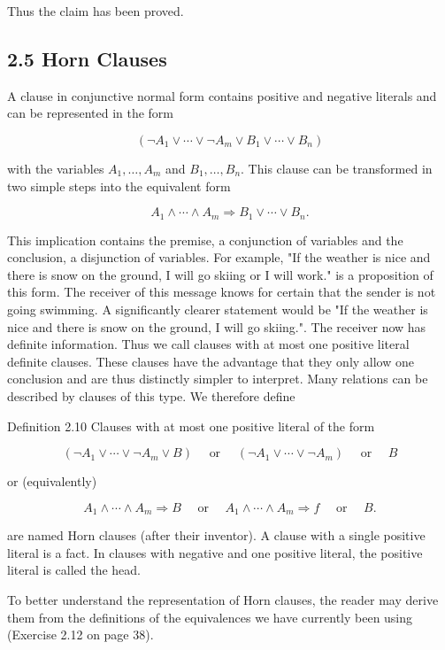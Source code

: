 \documentclass[10pt]{book}
\begin{document}
Thus the claim has been proved.

\subsection*{2.5 Horn Clauses}
A clause in conjunctive normal form contains positive and negative literals and can be represented in the form

$$
\left(\neg A_{1} \vee \cdots \vee \neg A_{m} \vee B_{1} \vee \cdots \vee B_{n}\right)
$$

with the variables $A_{1}, \ldots, A_{m}$ and $B_{1}, \ldots, B_{n}$. This clause can be transformed in two simple steps into the equivalent form

$$
A_{1} \wedge \cdots \wedge A_{m} \Rightarrow B_{1} \vee \cdots \vee B_{n} .
$$

This implication contains the premise, a conjunction of variables and the conclusion, a disjunction of variables. For example, "If the weather is nice and there is snow on the ground, I will go skiing or I will work." is a proposition of this form. The receiver of this message knows for certain that the sender is not going swimming. A significantly clearer statement would be "If the weather is nice and there is snow on the ground, I will go skiing.". The receiver now has definite information. Thus we call clauses with at most one positive literal definite clauses. These clauses have the advantage that they only allow one conclusion and are thus distinctly simpler to interpret. Many relations can be described by clauses of this type. We therefore define

Definition 2.10 Clauses with at most one positive literal of the form

$$
\left(\neg A_{1} \vee \cdots \vee \neg A_{m} \vee B\right) \quad \text { or } \quad\left(\neg A_{1} \vee \cdots \vee \neg A_{m}\right) \quad \text { or } \quad B
$$

or (equivalently)

$$
A_{1} \wedge \cdots \wedge A_{m} \Rightarrow B \quad \text { or } \quad A_{1} \wedge \cdots \wedge A_{m} \Rightarrow f \quad \text { or } \quad B .
$$

are named Horn clauses (after their inventor). A clause with a single positive literal is a fact. In clauses with negative and one positive literal, the positive literal is called the head.

To better understand the representation of Horn clauses, the reader may derive them from the definitions of the equivalences we have currently been using (Exercise 2.12 on page 38).
\end{document}

